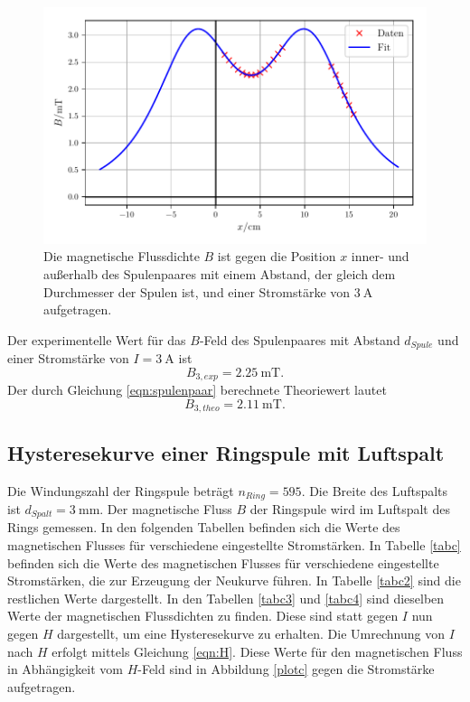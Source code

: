 \begin{figure}
    \centering
    \includegraphics{build/plotb3.pdf}
    \caption{Die magnetische Flussdichte $B$ ist gegen die Position $x$ inner-
    und außerhalb des Spulenpaares mit einem Abstand, der gleich dem Durchmesser
    der Spulen ist, und einer Stromstärke von $\SI{3}{\ampere}$ aufgetragen.}
    \label{plotb3}
\end{figure}

\noindent Der experimentelle Wert für das $B$-Feld des Spulenpaares
mit Abstand $d_{Spule}$ und einer Stromstärke von $I = \SI{3}{\ampere}$
ist
\begin{equation*}
   B_{3,exp} = \SI{2.25}{\milli\tesla}.
\end{equation*}
Der durch Gleichung \eqref{eqn:spulenpaar} berechnete Theoriewert
lautet
\begin{equation*}
   B_{3,theo} = \SI{2.11}{\milli\tesla}.
\end{equation*}

\subsection{Hysteresekurve einer Ringspule mit Luftspalt}
Die Windungszahl der Ringspule beträgt $n_{Ring} = \num{595}$.
Die Breite des Luftspalts ist $d_{Spalt} = \SI{3}{\milli\meter}$.
\newline
Der magnetische Fluss $B$ der Ringspule wird im Luftspalt
des Rings gemessen.
In den folgenden Tabellen befinden sich die Werte des magnetischen
Flusses für verschiedene eingestellte Stromstärken.
In Tabelle \ref{tabc} befinden sich die Werte des magnetischen Flusses
für verschiedene eingestellte Stromstärken, die zur Erzeugung der Neukurve
führen. In Tabelle \ref{tabc2} sind die restlichen Werte dargestellt.
\newline
In den Tabellen \ref{tabc3} und \ref{tabc4} sind dieselben Werte der
magnetischen Flussdichten zu finden. Diese sind statt gegen $I$ nun
gegen $H$ dargestellt, um eine Hysteresekurve zu erhalten.
Die Umrechnung von $I$ nach $H$ erfolgt mittels Gleichung \eqref{eqn:H}.
\newline
Diese Werte für den magnetischen Fluss in Abhängigkeit vom
$H$-Feld sind in Abbildung \ref{plotc} gegen die Stromstärke aufgetragen.





